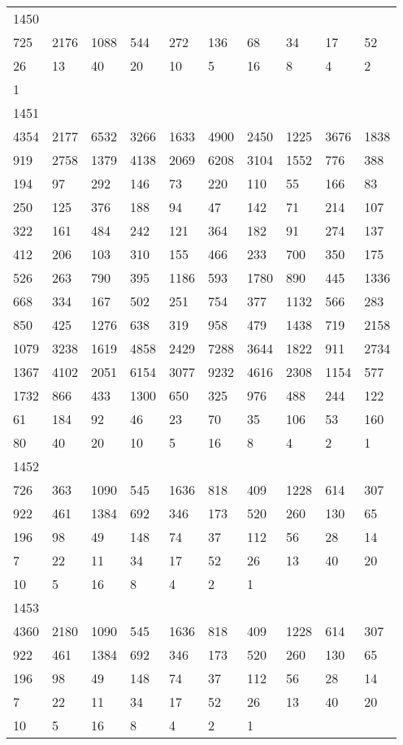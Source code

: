 \begin{longtable}{*{10}{l}}
1450&&&&&&&&&\\
725& 2176& 1088& 544& 272& 136& 68& 34& 17& 52\\
26& 13& 40& 20& 10& 5& 16& 8& 4& 2\\
1& \\

1451&&&&&&&&&\\
4354& 2177& 6532& 3266& 1633& 4900& 2450& 1225& 3676& 1838\\
919& 2758& 1379& 4138& 2069& 6208& 3104& 1552& 776& 388\\
194& 97& 292& 146& 73& 220& 110& 55& 166& 83\\
250& 125& 376& 188& 94& 47& 142& 71& 214& 107\\
322& 161& 484& 242& 121& 364& 182& 91& 274& 137\\
412& 206& 103& 310& 155& 466& 233& 700& 350& 175\\
526& 263& 790& 395& 1186& 593& 1780& 890& 445& 1336\\
668& 334& 167& 502& 251& 754& 377& 1132& 566& 283\\
850& 425& 1276& 638& 319& 958& 479& 1438& 719& 2158\\
1079& 3238& 1619& 4858& 2429& 7288& 3644& 1822& 911& 2734\\
1367& 4102& 2051& 6154& 3077& 9232& 4616& 2308& 1154& 577\\
1732& 866& 433& 1300& 650& 325& 976& 488& 244& 122\\
61& 184& 92& 46& 23& 70& 35& 106& 53& 160\\
80& 40& 20& 10& 5& 16& 8& 4& 2& 1\\

1452&&&&&&&&&\\
726& 363& 1090& 545& 1636& 818& 409& 1228& 614& 307\\
922& 461& 1384& 692& 346& 173& 520& 260& 130& 65\\
196& 98& 49& 148& 74& 37& 112& 56& 28& 14\\
7& 22& 11& 34& 17& 52& 26& 13& 40& 20\\
10& 5& 16& 8& 4& 2& 1& \\

1453&&&&&&&&&\\
4360& 2180& 1090& 545& 1636& 818& 409& 1228& 614& 307\\
922& 461& 1384& 692& 346& 173& 520& 260& 130& 65\\
196& 98& 49& 148& 74& 37& 112& 56& 28& 14\\
7& 22& 11& 34& 17& 52& 26& 13& 40& 20\\
10& 5& 16& 8& 4& 2& 1& \\


\end{longtable}
